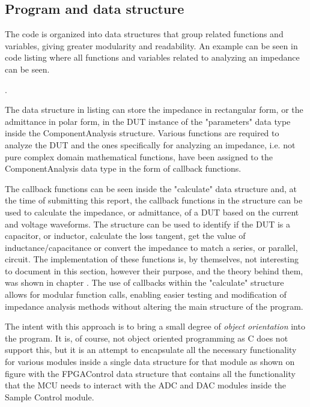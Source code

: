 \subsection{Program and data structure} \label{subsec:ProgramStructure}
The code is organized into data structures that group related functions and variables, giving greater modularity and readability. An example can be seen in code listing  where all functions and variables related to analyzing an impedance can be seen.

. 

The data structure in listing  can store the impedance in rectangular form, or the admittance in polar form, in the DUT instance of the "parameters" data type inside the ComponentAnalysis structure. Various functions are required to analyze the DUT and the ones specifically for analyzing an impedance, i.e. not pure complex domain mathematical functions, have been assigned to the ComponentAnalysis data type in the form of callback functions.

The callback functions can be seen inside the "calculate" data structure and, at the time of submitting this report, the callback functions in the structure can be used to calculate the impedance, or admittance, of a DUT based on the current and voltage waveforms. The structure can be used to identify if the DUT is a capacitor, or inductor, calculate the loss tangent, get the value of inductance/capacitance or convert the impedance to match a series, or parallel, circuit. The implementation of these functions is, by themselves, not interesting to document in this section, however their purpose, and the theory behind them, was shown in chapter . The use of callbacks within the "calculate" structure allows for modular function calls, enabling easier testing and modification of impedance analysis methods without altering the main structure of the program.

The intent with this approach is to bring a small degree of \textit{object orientation} into the program. It is, of course, not object oriented programming as C does not support this, but it is an attempt to encapsulate all the necessary functionality for various modules inside a single data structure for that module as shown on figure  with the FPGAControl data structure that contains all the functionality that the MCU needs to interact with the ADC and DAC modules inside the Sample Control module.

